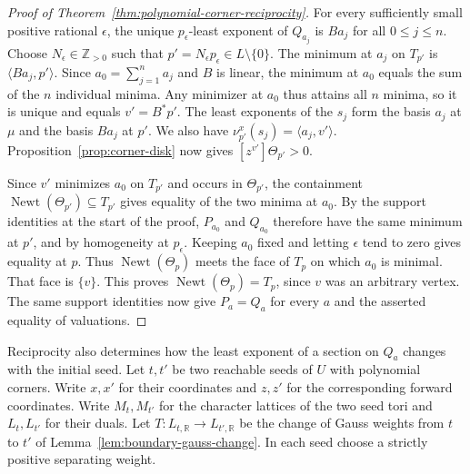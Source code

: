 \documentclass[11pt,reqno]{amsart}
\numberwithin{equation}{section}
\theoremstyle{definition}
\theoremstyle{remark}
\DeclareMathOperator{\Newt}{Newt}
\begin{document}
\begin{proof}[Proof of Theorem~\ref{thm:polynomial-corner-reciprocity}]
For every sufficiently small positive rational \(\epsilon\), the unique
\(p_\epsilon\)-least exponent of \(Q_{a_j}\) is \(Ba_j\) for all
\(0\le j\le n\). Choose \(N_\epsilon\in\mathbb Z_{>0}\) such that
\(p'=N_\epsilon p_\epsilon\in L\setminus\{0\}\). The minimum at
\(a_j\) on \(T_{p'}\) is \(\langle Ba_j,p'\rangle\). Since
\(a_0=\sum_{j=1}^n a_j\) and \(B\) is linear, the minimum at \(a_0\)
equals the sum of the \(n\) individual minima. Any minimizer at \(a_0\)
thus attains all \(n\) minima, so it is unique and equals \(v'=B^*p'\).
The least exponents of the \(s_j\) form the basis \(a_j\) at \(\mu\)
and the basis \(Ba_j\) at \(p'\). We also have
\(\nu^x_{p'}(s_j)=\langle a_j,v'\rangle\).
Proposition~\ref{prop:corner-disk} now gives \([z^{v'}]\Theta_{p'}>0\).

Since \(v'\) minimizes \(a_0\) on \(T_{p'}\) and occurs in \(\Theta_{p'}\),
the containment \(\Newt(\Theta_{p'})\subseteq T_{p'}\) gives equality
of the two minima at \(a_0\). By the support identities at the start
of the proof, \(P_{a_0}\) and \(Q_{a_0}\) therefore have the same
minimum at \(p'\), and by homogeneity at \(p_\epsilon\). Keeping
\(a_0\) fixed and letting \(\epsilon\) tend to zero gives equality
at \(p\). Thus \(\Newt(\Theta_p)\) meets the face of \(T_p\) on
which \(a_0\) is minimal. That face is \(\{v\}\). This proves
\(\Newt(\Theta_p)=T_p\), since \(v\) was an arbitrary vertex.
The same support identities now give \(P_a=Q_a\) for every \(a\)
and the asserted equality of valuations.
\end{proof}

Reciprocity also determines how the least exponent of a section on
\(Q_a\) changes with the initial seed. Let \(t,t'\) be two reachable
seeds of \(U\) with polynomial corners. Write \(x,x'\) for their
coordinates and \(z,z'\) for the corresponding forward coordinates.
Write \(M_t,M_{t'}\) for the character lattices of the two seed tori
and \(L_t,L_{t'}\) for their duals.
Let \(T:L_{t,\mathbb R}\to L_{t',\mathbb R}\) be the change of Gauss
weights from \(t\) to \(t'\) of Lemma~\ref{lem:boundary-gauss-change}.
In each seed choose a strictly positive separating weight.
\end{document}
